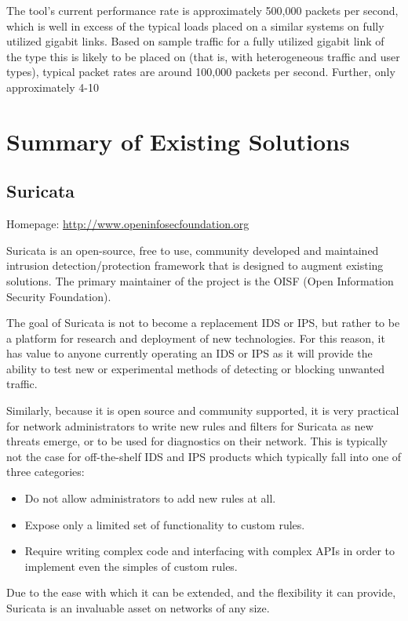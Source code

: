 \documentclass{article}
\theoremstyle{remark}
\theoremstyle{definition}
\theoremstyle{definition}
\theoremstyle{definition}
\begin{document}
The tool's current performance rate is approximately 500,000 packets per second, which is well in excess of the typical loads placed on a similar systems on fully utilized gigabit links. Based on sample traffic for a fully utilized gigabit link of the type this is likely to be placed on (that is, with heterogeneous traffic and user types), typical packet rates are around 100,000 packets per second. Further, only approximately 4-10%

\section{Summary of Existing Solutions}

\subsection{Suricata}
Homepage: \url{http://www.openinfosecfoundation.org}

Suricata is an open-source, free to use, community developed and maintained intrusion detection/protection framework that is designed to augment existing solutions. The primary maintainer of the project is the OISF (Open Information Security Foundation).

The goal of Suricata is not to become a replacement IDS or IPS, but rather to be a platform for research and deployment of new technologies. For this reason, it has value to anyone currently operating an IDS or IPS as it will provide the ability to test new or experimental methods of detecting or blocking unwanted traffic.

Similarly, because it is open source and community supported, it is very practical for network administrators to write new rules and filters for Suricata as new threats emerge, or to be used for diagnostics on their network. This is typically not the case for off-the-shelf IDS and IPS products which typically fall into one of three categories:

\begin{itemize}
\item Do not allow administrators to add new rules at all.
\item Expose only a limited set of functionality to custom rules.
\item Require writing complex code and interfacing with complex APIs in order to implement even the simples of custom rules.
\end{itemize}

Due to the ease with which it can be extended, and the flexibility it can provide, Suricata is an invaluable asset on networks of any size.
\end{document}
